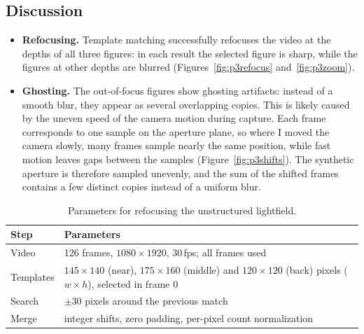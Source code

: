 \documentclass[11pt]{article}
\begin{document}
\subsection*{Discussion}
\begin{itemize}\setlength{\itemsep}{2pt}
\item \textbf{Refocusing.} Template matching successfully refocuses the video at the depths of all three figures: in each result the selected figure is sharp, while the figures at other depths are blurred (Figures~\ref{fig:p3refocus} and~\ref{fig:p3zoom}).
\item \textbf{Ghosting.} The out-of-focus figures show ghosting artifacts: instead of a smooth blur, they appear as several overlapping copies. This is likely caused by the uneven speed of the camera motion during capture. Each frame corresponds to one sample on the aperture plane, so where I moved the camera slowly, many frames sample nearly the same position, while fast motion leaves gaps between the samples (Figure~\ref{fig:p3shifts}). The synthetic aperture is therefore sampled unevenly, and the sum of the shifted frames contains a few distinct copies instead of a uniform blur.
\end{itemize}

\begin{table}[!htbp]
\centering
\small
\begin{tabular}{ll}
\toprule
Step & Parameters \\
\midrule
Video & 126 frames, $1080\times1920$, 30\,fps; all frames used \\
Templates & $145\times140$ (near), $175\times160$ (middle) and $120\times120$ (back) pixels ($w\times h$), selected in frame 0 \\
Search & $\pm30$ pixels around the previous match \\
Merge & integer shifts, zero padding, per-pixel count normalization \\
\bottomrule
\end{tabular}
\caption{Parameters for refocusing the unstructured lightfield.}
\label{tab:p3params}
\end{table}

\clearpage
\end{document}
